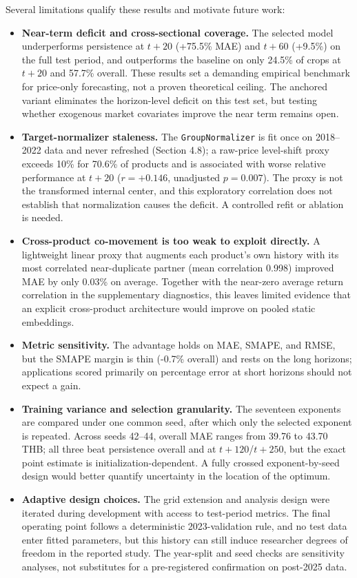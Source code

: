 \documentclass[review,3p,times]{elsarticle}
\begin{document}
Several limitations qualify these results and motivate future work:
\begin{itemize}
\item \textbf{Near-term deficit and cross-sectional coverage.} The selected model underperforms persistence at $t+20$ (+75.5\% MAE) and $t+60$ (+9.5\%) on the full test period, and outperforms the baseline on only 24.5\% of crops at $t+20$ and 57.7\% overall. These results set a demanding empirical benchmark for price-only forecasting, not a proven theoretical ceiling. The anchored variant eliminates the horizon-level deficit on this test set, but testing whether exogenous market covariates improve the near term remains open.
\item \textbf{Target-normalizer staleness.} The \texttt{GroupNormalizer} is fit once on 2018--2022 data and never refreshed (Section 4.8); a raw-price level-shift proxy exceeds 10\% for 70.6\% of products and is associated with worse relative performance at $t+20$ ($r=+0.146$, unadjusted $p=0.007$). The proxy is not the transformed internal center, and this exploratory correlation does not establish that normalization causes the deficit. A controlled refit or ablation is needed.
\item \textbf{Cross-product co-movement is too weak to exploit directly.} A lightweight linear proxy that augments each product's own history with its most correlated near-duplicate partner (mean correlation 0.998) improved MAE by only 0.03\% on average. Together with the near-zero average return correlation in the supplementary diagnostics, this leaves limited evidence that an explicit cross-product architecture would improve on pooled static embeddings.
\item \textbf{Metric sensitivity.} The advantage holds on MAE, SMAPE, and RMSE, but the SMAPE margin is thin (-0.7\% overall) and rests on the long horizons; applications scored primarily on percentage error at short horizons should not expect a gain.
\item \textbf{Training variance and selection granularity.} The seventeen exponents are compared under one common seed, after which only the selected exponent is repeated. Across seeds 42--44, overall MAE ranges from 39.76 to 43.70 THB; all three beat persistence overall and at $t+120$/$t+250$, but the exact point estimate is initialization-dependent. A fully crossed exponent-by-seed design would better quantify uncertainty in the location of the optimum.
\item \textbf{Adaptive design choices.} The grid extension and analysis design were iterated during development with access to test-period metrics. The final operating point follows a deterministic 2023-validation rule, and no test data enter fitted parameters, but this history can still induce researcher degrees of freedom in the reported study. The year-split and seed checks are sensitivity analyses, not substitutes for a pre-registered confirmation on post-2025 data.

\end{itemize}
\end{document}
